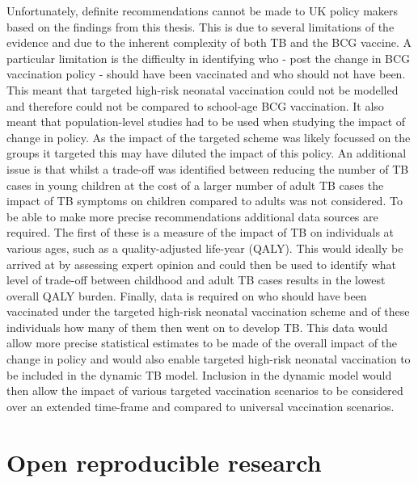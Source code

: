 \documentclass[11pt,twoside]{bristolthesis}
\begin{document}
  Unfortunately, definite recommendations cannot be made to UK policy makers based on the findings from this thesis. This is due to several limitations of the evidence and due to the inherent complexity of both TB and the BCG vaccine. A particular limitation is the difficulty in identifying who - post the change in BCG vaccination policy - should have been vaccinated and who should not have been. This meant that targeted high-risk neonatal vaccination could not be modelled and therefore could not be compared to school-age BCG vaccination. It also meant that population-level studies had to be used when studying the impact of change in policy. As the impact of the targeted scheme was likely focussed on the groups it targeted this may have diluted the impact of this policy. An additional issue is that whilst a trade-off was identified between reducing the number of TB cases in young children at the cost of a larger number of adult TB cases the impact of TB symptoms on children compared to adults was not considered. To be able to make more precise recommendations additional data sources are required. The first of these is a measure of the impact of TB on individuals at various ages, such as a quality-adjusted life-year (QALY). This would ideally be arrived at by assessing expert opinion and could then be used to identify what level of trade-off between childhood and adult TB cases results in the lowest overall QALY burden. Finally, data is required on who should have been vaccinated under the targeted high-risk neonatal vaccination scheme and of these individuals how many of them then went on to develop TB. This data would allow more precise statistical estimates to be made of the overall impact of the change in policy and would also enable targeted high-risk neonatal vaccination to be included in the dynamic TB model. Inclusion in the dynamic model would then allow the impact of various targeted vaccination scenarios to be considered over an extended time-frame and compared to universal vaccination scenarios.
  
  \hypertarget{open-reproducible-research}{%
  \section{Open reproducible research}\label{open-reproducible-research}}
  
\end{document}
